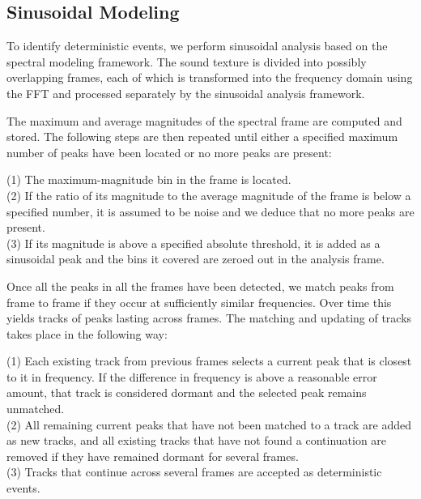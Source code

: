 \documentclass{acmsiggraph}               %
\begin{document}
\subsection{Sinusoidal Modeling}

To identify deterministic events, we perform sinusoidal analysis based on the spectral 
modeling framework. The sound texture is divided into possibly overlapping 
frames, each of which is transformed into the frequency domain using the 
FFT and processed separately by the sinusoidal analysis framework.

The maximum and average 
magnitudes of the spectral frame are computed and stored. The following 
steps are then repeated until either a specified maximum number of peaks 
have been located or no more peaks are present:

(1) The maximum-magnitude bin in the frame is located.\\
(2) If the ratio of its magnitude to the average magnitude of the frame is 
below a specified number, it is assumed to be noise and we deduce that no 
more peaks are present.\\
(3) If its magnitude is above a specified absolute threshold, it is added as a sinusoidal peak and the bins it covered are zeroed out in the analysis frame.

Once all the peaks in all the frames have been detected, we match peaks 
from frame to frame if they occur at sufficiently similar frequencies. 
Over time this yields tracks of peaks lasting across frames. The 
matching and updating of tracks takes place in the following way:

(1) Each existing track from previous frames selects a current peak that is 
closest to it in frequency. If the difference in 
frequency is above a reasonable error amount, that track is considered dormant 
and the selected peak remains unmatched.\\
(2) All remaining current peaks that have not been matched to a track are 
added as new tracks, and all existing tracks that have not found a 
continuation are removed if they have remained dormant for several frames.\\
(3) Tracks that continue across several frames are accepted as 
deterministic events.
\end{document}
